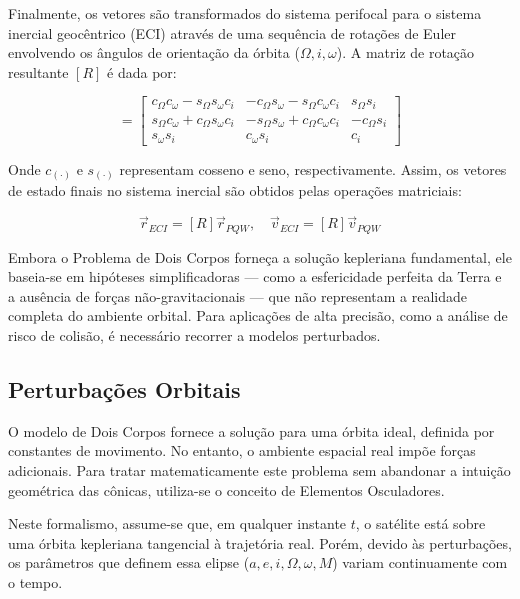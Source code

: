 Finalmente, os vetores são transformados do sistema perifocal para o sistema inercial geocêntrico (ECI) através de uma sequência de rotações de Euler envolvendo os ângulos de orientação da órbita ($\Omega, i, \omega$). A matriz de rotação resultante $[R]$ é dada por:

\begin{equation}
    [R] = \begin{bmatrix}
    c_{\Omega} c_{\omega} - s_{\Omega} s_{\omega} c_i & -c_{\Omega} s_{\omega} - s_{\Omega} c_{\omega} c_i & s_{\Omega} s_i \\
    s_{\Omega} c_{\omega} + c_{\Omega} s_{\omega} c_i & -s_{\Omega} s_{\omega} + c_{\Omega} c_{\omega} c_i & -c_{\Omega} s_i \\
    s_{\omega} s_i & c_{\omega} s_i & c_i
    \end{bmatrix}
    \label{eq:matriz_rotacao}
\end{equation}

Onde $c_{(\cdot)}$ e $s_{(\cdot)}$ representam cosseno e seno, respectivamente. Assim, os vetores de estado finais no sistema inercial são obtidos pelas operações matriciais:

\begin{equation}
    \vec{r}_{ECI} = [R] \vec{r}_{PQW}, \quad \vec{v}_{ECI} = [R] \vec{v}_{PQW}
    \label{eq:conversao_final}
\end{equation}

Embora o Problema de Dois Corpos forneça a solução kepleriana fundamental, ele baseia-se em hipóteses simplificadoras — como a esfericidade perfeita da Terra e a ausência de forças não-gravitacionais — que não representam a realidade completa do ambiente orbital. Para aplicações de alta precisão, como a análise de risco de colisão, é necessário recorrer a modelos perturbados.

\subsection{Perturbações Orbitais}
\label{subsec:perturbacoes}

O modelo de Dois Corpos fornece a solução para uma órbita ideal, definida por constantes de movimento. No entanto, o ambiente espacial real impõe forças adicionais. Para tratar matematicamente este problema sem abandonar a intuição geométrica das cônicas, utiliza-se o conceito de Elementos Osculadores.

Neste formalismo, assume-se que, em qualquer instante $t$, o satélite está sobre uma órbita kepleriana tangencial à trajetória real. Porém, devido às perturbações, os parâmetros que definem essa elipse ($a, e, i, \Omega, \omega, M$) variam continuamente com o tempo.

